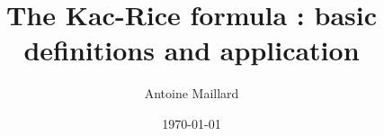 \documentclass[amsmath,amssymb,nofootinbib,prd]{article}
\begin{document}
\title{The Kac-Rice formula : basic definitions and application}
\date{\today}
\author{Antoine Maillard}
\maketitle
%
\renewcommand{\labelitemi}{$\bullet$}


\section{}

 

\end{document}
